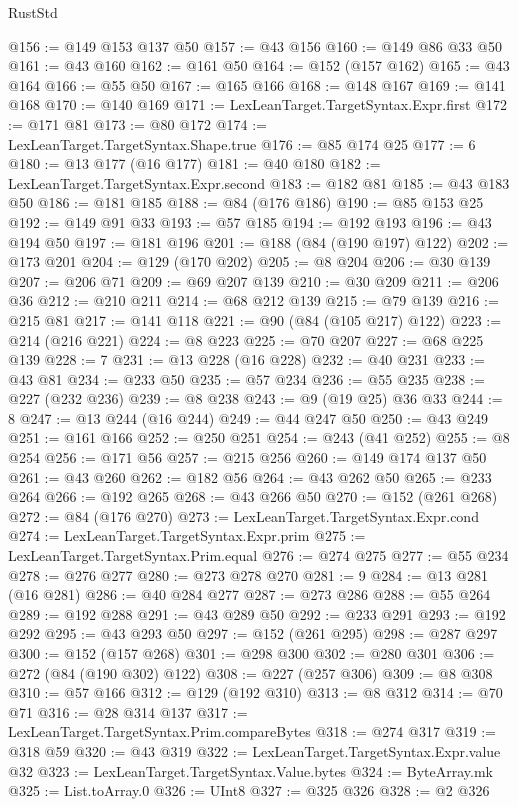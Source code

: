 \begin{lexlean}{RustStd}
\begin{coremodule}
@156 := @149 @153 @137 @50
@157 := @43 @156
@160 := @149 @86 @33 @50
@161 := @43 @160
@162 := @161 @50
@164 := @152 (@157 @162)
@165 := @43 @164
@166 := @55 @50
@167 := @165 @166
@168 := @148 @167
@169 := @141 @168
@170 := @140 @169
@171 := LexLeanTarget.TargetSyntax.Expr.first
@172 := @171 @81
@173 := @80 @172
@174 := LexLeanTarget.TargetSyntax.Shape.true
@176 := @85 @174 @25
@177 := 6
@180 := @13 @177 (@16 @177)
@181 := @40 @180
@182 := LexLeanTarget.TargetSyntax.Expr.second
@183 := @182 @81
@185 := @43 @183 @50
@186 := @181 @185
@188 := @84 (@176 @186)
@190 := @85 @153 @25
@192 := @149 @91 @33
@193 := @57 @185
@194 := @192 @193
@196 := @43 @194 @50
@197 := @181 @196
@201 := @188 (@84 (@190 @197) @122)
@202 := @173 @201
@204 := @129 (@170 @202)
@205 := @8 @204
@206 := @30 @139
@207 := @206 @71
@209 := @69 @207 @139
@210 := @30 @209
@211 := @206 @36
@212 := @210 @211
@214 := @68 @212 @139
@215 := @79 @139
@216 := @215 @81
@217 := @141 @118
@221 := @90 (@84 (@105 @217) @122)
@223 := @214 (@216 @221)
@224 := @8 @223
@225 := @70 @207
@227 := @68 @225 @139
@228 := 7
@231 := @13 @228 (@16 @228)
@232 := @40 @231
@233 := @43 @81
@234 := @233 @50
@235 := @57 @234
@236 := @55 @235
@238 := @227 (@232 @236)
@239 := @8 @238
@243 := @9 (@19 @25) @36 @33
@244 := 8
@247 := @13 @244 (@16 @244)
@249 := @44 @247 @50
@250 := @43 @249
@251 := @161 @166
@252 := @250 @251
@254 := @243 (@41 @252)
@255 := @8 @254
@256 := @171 @56
@257 := @215 @256
@260 := @149 @174 @137 @50
@261 := @43 @260
@262 := @182 @56
@264 := @43 @262 @50
@265 := @233 @264
@266 := @192 @265
@268 := @43 @266 @50
@270 := @152 (@261 @268)
@272 := @84 (@176 @270)
@273 := LexLeanTarget.TargetSyntax.Expr.cond
@274 := LexLeanTarget.TargetSyntax.Expr.prim
@275 := LexLeanTarget.TargetSyntax.Prim.equal
@276 := @274 @275
@277 := @55 @234
@278 := @276 @277
@280 := @273 @278 @270
@281 := 9
@284 := @13 @281 (@16 @281)
@286 := @40 @284 @277
@287 := @273 @286
@288 := @55 @264
@289 := @192 @288
@291 := @43 @289 @50
@292 := @233 @291
@293 := @192 @292
@295 := @43 @293 @50
@297 := @152 (@261 @295)
@298 := @287 @297
@300 := @152 (@157 @268)
@301 := @298 @300
@302 := @280 @301
@306 := @272 (@84 (@190 @302) @122)
@308 := @227 (@257 @306)
@309 := @8 @308
@310 := @57 @166
@312 := @129 (@192 @310)
@313 := @8 @312
@314 := @70 @71
@316 := @28 @314 @137
@317 := LexLeanTarget.TargetSyntax.Prim.compareBytes
@318 := @274 @317
@319 := @318 @59
@320 := @43 @319
@322 := LexLeanTarget.TargetSyntax.Expr.value @32
@323 := LexLeanTarget.TargetSyntax.Value.bytes
@324 := ByteArray.mk
@325 := List.toArray.{0}
@326 := UInt8
@327 := @325 @326
@328 := @2 @326

\end{coremodule}
\end{lexlean}
